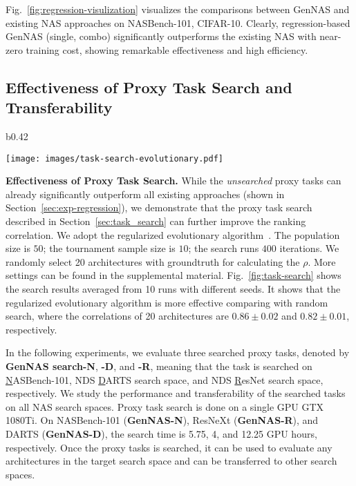 \documentclass{article}
\begin{document}
\vspace{-5pt}


Fig.~\ref{fig:regression-visulization} visualizes the comparisons between GenNAS and existing NAS approaches on NASBench-101, CIFAR-10. Clearly, regression-based GenNAS (single, combo) significantly outperforms the existing NAS with near-zero training cost, showing remarkable effectiveness and high efficiency.

\vspace{-13pt}

\subsection{Effectiveness of Proxy Task Search and Transferability}
\label{sec:task-search-transfer}
\vspace{-8pt}


\begin{wrapfigure}{b}{0.42\textwidth}
\vspace{-14pt}
  \begin{center}
    \texttt{[image: images/task-search-evolutionary.pdf]}
  \end{center}
  \vspace{-10pt}
  \caption{Proxy task search.}
  \label{fig:task-search}
\end{wrapfigure}



\textbf{Effectiveness of Proxy Task Search.} 
While the \textit{unsearched} proxy tasks can already significantly outperform all existing approaches (shown in Section~\ref{sec:exp-regression}), we demonstrate that the proxy task search described in Section~\ref{sec:task_search} can further improve the ranking correlation.
We adopt the regularized evolutionary algorithm~\cite{real2019regularized}. The population size is $50$; the tournament sample size is $10$; 
the search runs $400$ iterations. We randomly select 20 architectures with groundtruth for calculating the $\rho$. More settings can be found in the supplemental material.
Fig.~\ref{fig:task-search} shows the search results averaged from 10 runs with different seeds.
It shows that the regularized evolutionary algorithm is more effective comparing with random search, where the correlations of 20 architectures are $0.86\pm0.02$ and $0.82\pm0.01$, respectively.



In the following experiments, we evaluate three searched proxy tasks, denoted by \textbf{GenNAS search-N}, \textbf{-D}, and \textbf{-R}, meaning that the task is searched on \underline{N}ASBench-101, NDS \underline{D}ARTS search space, and NDS \underline{R}esNet search space, respectively.
We study the performance and transferability of the searched tasks on all NAS search spaces. Proxy task search is done on a single GPU GTX 1080Ti. On NASBench-101 (\textbf{GenNAS-N}), ResNeXt (\textbf{GenNAS-R}), and DARTS (\textbf{GenNAS-D}), the search time is 5.75, 4, and 12.25 GPU hours, respectively. Once the proxy tasks is searched, it can be used to evaluate any architectures in the target search space and can be transferred to other search spaces.
\end{document}

